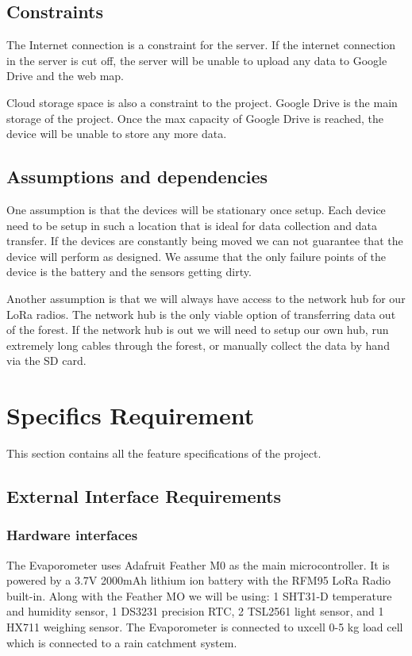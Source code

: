 \documentclass[onecolumn, draftclsnofoot,10pt, compsoc]{IEEEtran}
\begin{document}
\subsection{Constraints}
The Internet connection is a constraint for the server. If the internet connection in the server is cut off, the server will be unable to upload any data to Google Drive and the web map.


Cloud storage space is also a constraint to the project. Google Drive is the main storage of the project. Once the max capacity of Google Drive is reached, the device will be unable to store any more data. 
\subsection {Assumptions and dependencies}
One assumption is that the devices will be stationary once setup.  Each device need to be setup in such a location that is ideal for data collection and data transfer.  If the devices are constantly being moved we can not guarantee that the device will perform as designed.  We assume that the only failure points of the device is the battery and the sensors getting dirty.


Another assumption is that we will always have access to the network hub for our LoRa radios.  The network hub is the only viable option of transferring data out of the forest.  If the network hub is out we will need to setup our own hub, run extremely long cables through the forest, or manually collect the data by hand via the SD card.
\section{Specifics Requirement}
This section contains all the feature specifications of the project.

\subsection{External Interface Requirements}

\subsubsection{Hardware interfaces}
The Evaporometer uses Adafruit Feather M0 as the main microcontroller. It is powered by a 3.7V 2000mAh lithium ion battery with the RFM95 LoRa Radio built-in.  Along with the Feather MO we will be using: 1 SHT31-D temperature and humidity sensor, 1 DS3231 precision RTC, 2 TSL2561 light sensor, and 1 HX711 weighing sensor. The Evaporometer is connected to uxcell 0-5 kg load cell which is connected to a rain catchment system.
\end{document}
